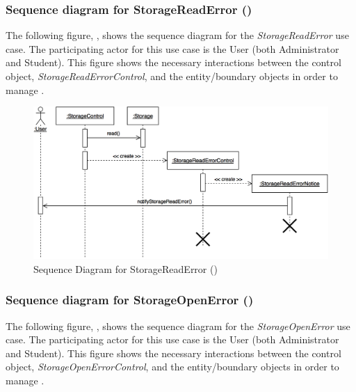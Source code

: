 \documentclass[12pt,letterpaper]{article}
\begin{document}
\newpage{}

\subsubsection*{Sequence diagram for StorageReadError ()}

The following figure, , shows the sequence diagram for the {\it StorageReadError} use case. The participating actor for this use case is
the User (both Administrator and Student). This figure shows the necessary interactions between the control object, {\it StorageReadErrorControl}, and the
entity/boundary objects in order to manage .

\begin{figure}[H]
	\centering{}
	\includegraphics[scale=0.27]{imgs/seq/storage-read-error.png}
	\caption[ - Sequence Diagram for StorageReadError]{Sequence Diagram for StorageReadError ()}
\end{figure}

\subsubsection*{Sequence diagram for StorageOpenError ()}

The following figure, , shows the sequence diagram for the {\it StorageOpenError} use case. The participating actor for this use case is
the User (both Administrator and Student). This figure shows the necessary interactions between the control object, {\it StorageOpenErrorControl}, and the
entity/boundary objects in order to manage .
\end{document}

